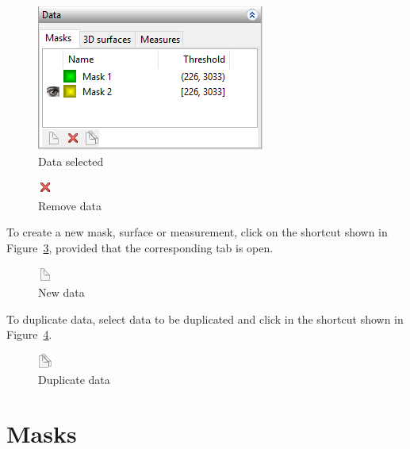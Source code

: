 \begin{figure}[!htb]
\centering
\includegraphics[scale=0.7]{../user_guide_figures/invesalius_screen/painel_selected_mask_en.png}
\caption{Data selected}
\label{fig:selected_mask}
\end{figure}


\begin{figure}[!htb]
\centering
\includegraphics[scale=0.8]{../user_guide_figures/icons/data_remove.png}
\caption{Remove data}
\label{fig:delete_data}
\end{figure}

To create a new mask, surface or measurement, click on the shortcut shown in Figure~\ref{fig:new_data}, provided that the corresponding tab is open.

\begin{figure}[!htb]
\centering
\includegraphics[scale=0.8]{../user_guide_figures/icons/data_new.png}
\caption{New data}
\label{fig:new_data}
\end{figure}

To duplicate data, select data to be duplicated and click in the shortcut shown in Figure~\ref{fig:duplicate_data}.

\begin{figure}[!htb]
\centering
\includegraphics[scale=0.8]{../user_guide_figures/icons/data_duplicate.png}
\caption{Duplicate data}
\label{fig:duplicate_data}
\end{figure}

\newpage

\section{Masks}


